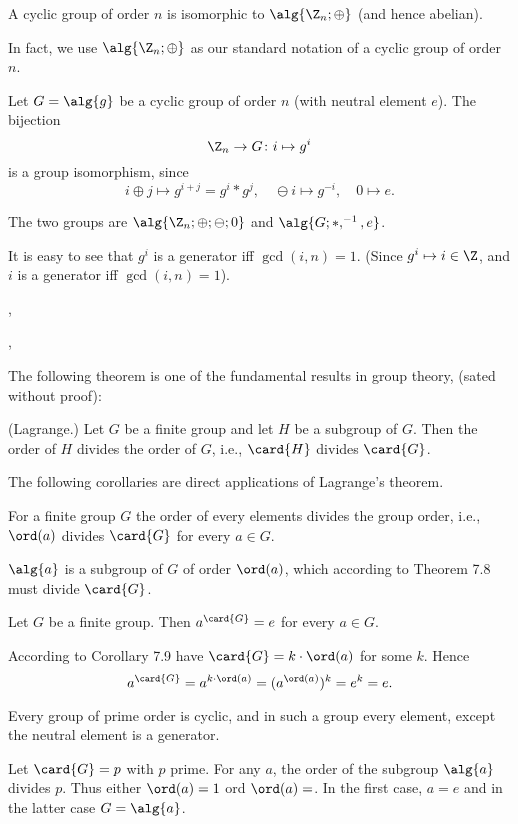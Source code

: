  A cyclic group of order $n$ is isomorphic to $\alg{\Z_n;\oplus}$ (and
hence abelian).

\Com In fact, we use $\alg{\Z_n;\oplus}$ as our standard notation of a cyclic
group of order $n$.

\Proof Let $G=\alg{g}$ be a cyclic group of order $n$ (with neutral element
$e$). The bijection
\[
\Z_n\to G\colon i\mapsto g^{i}
\]
is a group isomorphism, since
\[
i\oplus j \mapsto g^{i+j} = g^{i}*g^{j}, \quad
\ominus i \mapsto g^{-i}, \quad
0\mapsto e.
\]

\Com The two groups are $\alg{\Z_n;\oplus;\ominus;0}$ and $\alg{G;*,^{-1},e}$.

\Com It is easy to see that $g^{i}$ is a generator iff $\gcd(i,n)=1$. (Since
$g^{i}\mapsto i \in \Z$, and $i$ is a generator iff $\gcd(i,n)=1$).

\sep


\sep

The following theorem is one of the fundamental results in group theory, (sated
without proof):

 (Lagrange.) Let $G$ be a finite group and let $H$ be a subgroup of
$G$. Then the order of $H$ divides the order of $G$, i.e., $\card{H}$ divides
$\card{G}$.

The following corollaries are direct applications of Lagrange's theorem.

 For a finite group $G$ the order of every elements divides the group
order, i.e., $\ord(a)$ divides $\card{G}$ for every $a\in G$.

\Proof $\alg{a}$ is a subgroup of $G$ of order $\ord(a)$, which according to
Theorem 7.8 must divide $\card{G}$.

 Let $G$ be a finite group. Then $a^{\card{G}}=e$ for every $a\in G$.

\Proof According to Corollary 7.9 have $\card{G}=k\cdot \ord(a)$ for some $k$.
Hence
\[
a^{\card{G}} = a^{k\cdot \ord(a)} = (a^{\ord(a)})^{k} = e^{k} = e.
\]

 Every group of prime order is cyclic, and in such a group every
element, except the neutral element is a generator.

\Proof Let $\card{G}=p$ with $p$ prime. For any $a$, the order of the subgroup
$\alg{a}$ divides $p$. Thus either $\ord(a)=1$ ord $\ord(a)=$. In the first
case, $a=e$ and in the latter case $G=\alg{a}$.

